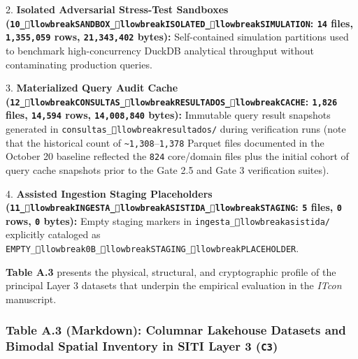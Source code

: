 \documentclass[10pt,a4paper]{article}
\begin{document}
2. \textbf{Isolated Adversarial Stress-Test Sandboxes (\texttt{10\_llowbreak{}SANDBOX\_llowbreak{}ISOLATED\_llowbreak{}SIMULATION}: \texttt{14} files, \texttt{1,355,059} rows, \texttt{21,343,402} bytes):} Self-contained simulation partitions used to benchmark high-concurrency DuckDB analytical throughput without contaminating production queries.\par
3. \textbf{Materialized Query Audit Cache (\texttt{12\_llowbreak{}CONSULTAS\_llowbreak{}RESULTADOS\_llowbreak{}CACHE}: \texttt{1,826} files, \texttt{14,594} rows, \texttt{14,008,840} bytes):} Immutable query result snapshots generated in \texttt{consultas\_llowbreak{}resultados/} during verification runs (note that the historical count of \texttt{\textasciitilde{}1,308}--\texttt{1,378} Parquet files documented in the October 20 baseline reflected the \texttt{824} core/domain files plus the initial cohort of query cache snapshots prior to the Gate 2.5 and Gate 3 verification suites).\par
4. \textbf{Assisted Ingestion Staging Placeholders (\texttt{11\_llowbreak{}INGESTA\_llowbreak{}ASISTIDA\_llowbreak{}STAGING}: \texttt{5} files, \texttt{0} rows, \texttt{0} bytes):} Empty staging markers in \texttt{ingesta\_llowbreak{}asistida/} explicitly cataloged as \texttt{EMPTY\_llowbreak{}0B\_llowbreak{}STAGING\_llowbreak{}PLACEHOLDER}.\par

\textbf{Table A.3} presents the physical, structural, and cryptographic profile of the principal Layer 3 datasets that underpin the empirical evaluation in the \textit{ITcon} manuscript.

\subsubsection*{Table A.3 (Markdown): Columnar Lakehouse Datasets and Bimodal Spatial Inventory in SITI Layer 3 (\texttt{C3})}
\end{document}
